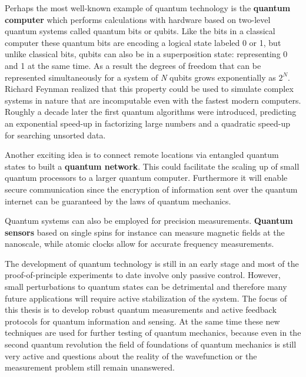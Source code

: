 Perhaps the most well-known example of quantum technology is the \textbf{quantum computer}\cite{Nielsen__2000,Mermin__2007} which performs calculations with hardware based on two-level quantum systems called quantum bits or qubits. Like the bits in a classical computer these quantum bits are encoding a logical state labeled 0 or 1, but unlike classical bits, qubits can also be in a superposition state: representing 0 and 1 at the same time. As a result the degrees of freedom that can be represented simultaneously for a system of \textit{N} qubits grows exponentially as $2^N$. Richard Feynman realized that this property could be used to simulate complex systems in nature\cite{Feynman_IntJTheorPhys_1982} that are incomputable even with the fastest modern computers. Roughly a decade later the first quantum algorithms were introduced, predicting an exponential speed-up in factorizing large numbers\cite{Shor_SIAMJ.Comput._1997} and a quadratic speed-up for searching unsorted data\cite{Grover_Phys.Rev.Lett._1997}.

Another exciting idea is to connect remote locations via entangled quantum states to built a \textbf{quantum network}\cite{Kimble_Nature_2008}. This could facilitate the scaling up of small quantum processors to a larger quantum computer. Furthermore it will enable secure communication since the encryption of information sent over the quantum internet can be guaranteed by the laws of quantum mechanics\cite{Gisin_NatPhoton_2007}.

Quantum systems can also be employed for precision measurements. \textbf{Quantum sensors} based on single spins for instance can measure magnetic fields at the nanoscale\cite{Taylor_NatPhys_2008}, while atomic clocks allow for accurate frequency measurements\cite{Diddams_Science_2001}.

The development of quantum technology is still in an early stage and most of the proof-of-principle experiments to date involve only passive control. However, small perturbations to quantum states can be detrimental and therefore many future applications will require active stabilization of the system\cite{Wiseman__2010,Devoret_Science_2013}. The focus of this thesis is to develop robust quantum measurements and active feedback protocols for quantum information and sensing. At the same time these new techniques are used for further testing of quantum mechanics, because even in the second quantum revolution the field of foundations of quantum mechanics is still very active and questions about the reality of the wavefunction\cite{Pusey_NatPhys_2012} or the measurement problem still remain unanswered\cite{Laloe__2012}. 

